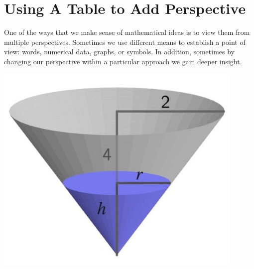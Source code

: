 \documentclass{ximera}
\begin{document}

\section{Using A Table to Add Perspective}

One of the ways that we make sense of mathematical ideas is to view them from multiple perspectives.  Sometimes we use different means to establish a point of view:  words, numerical data, graphs, or symbols.  In addition, sometimes by changing our perspective within a particular approach we gain deeper insight.%

\begin{image}
\includegraphics[width=0.9\textwidth]{CiTtext6.jpg}
\end{image}
\end{document}
